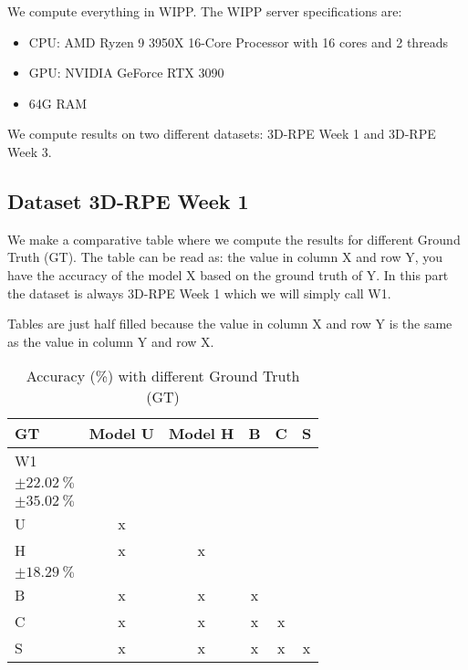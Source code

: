 We compute everything in WIPP. The WIPP server specifications are:
\begin{itemize}
  \item CPU: AMD Ryzen 9 3950X 16-Core Processor with 16 cores and 2 threads
  \item GPU: NVIDIA GeForce RTX 3090
  \item 64G RAM
\end{itemize}

We compute results on two different datasets: 3D-RPE Week 1 and 3D-RPE Week 3.

\subsection{Dataset 3D-RPE Week 1}


We make a comparative table where we compute the results for different Ground
Truth (GT). The table can be read as: the value in column X and row Y, you have
the accuracy of the model X based on the ground truth of Y. In this part the
dataset is always 3D-RPE Week 1 which we will simply call W1.

Tables are just half filled because the value in column X and row Y is the
same as the value in column Y and row X.

\begin{table}[H]
\small
\centering
\caption{\label{tab:base3dRPEdatamask}%
  Accuracy (\%) with different Ground Truth (GT)
}
\begin{tabular}{lccccc}
  \toprule
  GT & Model U & Model H & B & C & S \\
  \midrule
  W1 &  & \makecell{$\SI{25.05}{\percent}$ \\ $\pm \SI{22.02}{\percent}$} &  &  & \makecell{$\SI{38.16}{\percent}$ \\ $\pm \SI{35.02}{\percent}$} \\
  U & x &  &  &  &  \\
  H & x & x &  &  & \makecell{$\SI{82.51}{\percent}$ \\ $\pm \SI{18.29}{\percent}$} \\
  B & x & x & x &  &  \\
  C & x & x & x & x &  \\
  S & x & x & x & x & x \\
  \bottomrule
\end{tabular}
\end{table}

